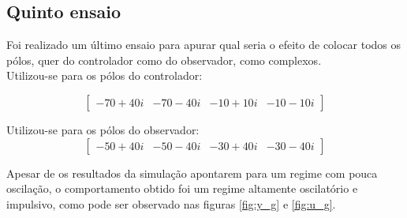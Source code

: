 \documentclass[%
  reprint,
  nofootinbib,
  amsmath,amssymb,
  aps,
  10pt,
  a4paper
]{revtex4-1}
\begin{document}
\subsection{Quinto ensaio}

Foi realizado um último ensaio para apurar qual seria o efeito de colocar todos os pólos, quer do controlador como do observador, como complexos.\\

Utilizou-se para os pólos do controlador:

\begin{equation}
\begin{bmatrix}
-70+40i & -70-40i & -10+10i &-10-10i
\end{bmatrix}
\end{equation}

Utilizou-se para os pólos do observador:
\begin{equation}
\begin{bmatrix}
-50+40i & -50-40i & -30+40i &-30-40i
\end{bmatrix}
\end{equation}

Apesar de os resultados da simulação apontarem para um regime com pouca oscilação, o comportamento obtido foi um regime altamente oscilatório e impulsivo, como pode ser observado nas figuras \ref{fig:y_g} e \ref{fig:u_g}.
\end{document}
